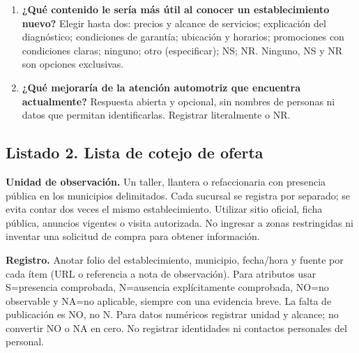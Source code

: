 {\begin{enumerate}
\item[D21.] \textbf{¿Qué contenido le sería más útil al conocer un establecimiento nuevo?} Elegir hasta dos: precios y alcance de servicios; explicación del diagnóstico; condiciones de garantía; ubicación y horarios; promociones con condiciones claras; ninguno; otro (especificar); NS; NR. Ninguno, NS y NR son opciones exclusivas.
\item[D22.] \textbf{¿Qué mejoraría de la atención automotriz que encuentra actualmente?} Respuesta abierta y opcional, sin nombres de personas ni datos que permitan identificarlas. Registrar literalmente o NR.
\end{enumerate}

\subsection{Listado 2. Lista de cotejo de oferta}
\textbf{Unidad de observación.} Un taller, llantera o refaccionaria con presencia pública en los municipios delimitados. Cada sucursal se registra por separado; se evita contar dos veces el mismo establecimiento. Utilizar sitio oficial, ficha pública, anuncios vigentes o visita autorizada. No ingresar a zonas restringidas ni inventar una solicitud de compra para obtener información.

\textbf{Registro.} Anotar folio del establecimiento, municipio, fecha/hora y fuente por cada ítem (URL o referencia a nota de observación). Para atributos usar S=presencia comprobada, N=ausencia explícitamente comprobada, NO=no observable y NA=no aplicable, siempre con una evidencia breve. La falta de publicación es NO, no N. Para datos numéricos registrar unidad y alcance; no convertir NO o NA en cero. No registrar identidades ni contactos personales del personal.

}
